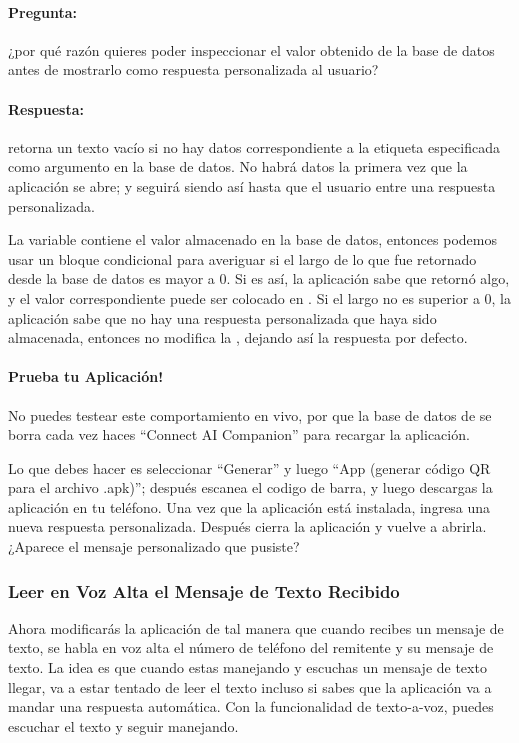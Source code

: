 {{\paragraph{Pregunta:} ¿por qué razón quieres poder inspeccionar el
valor obtenido de la base de datos antes de mostrarlo como respuesta
personalizada al usuario?  {}

\paragraph{Respuesta:}  retorna un texto vacío si no
hay datos correspondiente a la etiqueta especificada como argumento en
la base de datos. No habrá datos la primera vez que la aplicación se
abre; y seguirá siendo así hasta que el usuario entre una respuesta
personalizada.

La variable  contiene el valor almacenado en la
base de datos, entonces podemos usar un bloque condicional para
averiguar si el largo de lo que fue retornado desde la base de datos
es mayor a 0. Si es así, la aplicación sabe que 
retornó algo, y el valor correspondiente puede ser colocado en
. Si el largo no es superior a 0, la
aplicación sabe que no hay una respuesta personalizada que haya sido
almacenada, entonces no modifica la ,
dejando así la respuesta por defecto.

\paragraph{Prueba tu Aplicación!} No puedes testear este
comportamiento en vivo, por que la base de datos de 
se borra cada vez haces ``Connect AI Companion'' para recargar la
aplicación.

Lo que debes hacer es seleccionar ``Generar'' y luego ``App (generar
código QR para el archivo .apk)''; después escanea el codigo de barra,
y luego descargas la aplicación en tu teléfono. Una vez que la
aplicación está instalada, ingresa una nueva respuesta
personalizada. Después cierra la aplicación y vuelve a
abrirla. ¿Aparece el mensaje personalizado que pusiste?

\subsubsection*{Leer en Voz Alta el Mensaje de Texto Recibido}

Ahora modificarás la aplicación de tal manera que cuando recibes un
mensaje de texto, se habla en voz alta el número de teléfono del
remitente y su mensaje de texto. La idea es que cuando estas manejando
y escuchas un mensaje de texto llegar, va a estar tentado de leer el
texto incluso si sabes que la aplicación va a mandar una respuesta
automática. Con la funcionalidad de texto-a-voz, puedes escuchar el
texto y seguir manejando.

}}

